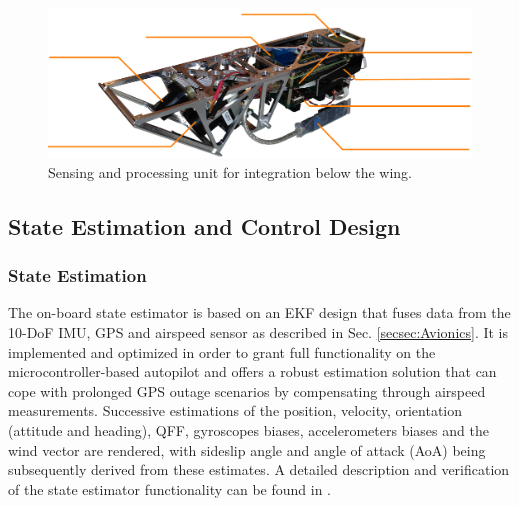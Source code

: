 %  
\begin{figure}[tb]
    \centering
     \includegraphics[width=\linewidth]{images/pod}
    \caption[Modular sensing and processing unit.]{Sensing and processing unit for integration below the wing.}
    \label{f:03_sensor_pod}
\end{figure}

\subsection{State Estimation and Control Design}

\subsubsection{State Estimation} \label{secsec:StateEstimation}

The on-board state estimator is based on an EKF design that fuses data from the 10-DoF IMU, GPS and airspeed sensor as described in Sec. \ref{secsec:Avionics}. It is implemented and optimized in order to grant full functionality on the microcontroller-based autopilot and offers a robust estimation solution that can cope with prolonged GPS outage scenarios by compensating through airspeed measurements. Successive estimations of the position, velocity, orientation (attitude and heading), QFF, gyroscopes biases, accelerometers biases and the wind vector are rendered, with sideslip angle and angle of attack (AoA) being subsequently derived from these estimates. A detailed description and verification of the state estimator functionality can be found in \cite{Leutenegger_MSC2014}.
  
